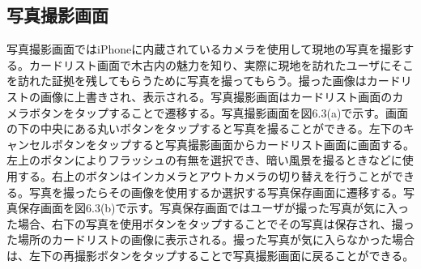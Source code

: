\subsection{写真撮影画面}
写真撮影画面ではiPhoneに内蔵されているカメラを使用して現地の写真を撮影する。カードリスト画面で木古内の魅力を知り、実際に現地を訪れたユーザにそこを訪れた証拠を残してもらうために写真を撮ってもらう。撮った画像はカードリストの画像に上書きされ、表示される。写真撮影画面はカードリスト画面のカメラボタンをタップすることで遷移する。写真撮影画面を図6.3(a)で示す。画面の下の中央にある丸いボタンをタップすると写真を撮ることができる。左下のキャンセルボタンをタップすると写真撮影画面からカードリスト画面に画面する。左上のボタンによりフラッシュの有無を選択でき、暗い風景を撮るときなどに使用する。右上のボタンはインカメラとアウトカメラの切り替えを行うことができる。写真を撮ったらその画像を使用するか選択する写真保存画面に遷移する。写真保存画面を図6.3(b)で示す。写真保存画面ではユーザが撮った写真が気に入った場合、右下の写真を使用ボタンをタップすることでその写真は保存され、撮った場所のカードリストの画像に表示される。撮った写真が気に入らなかった場合は、左下の再撮影ボタンをタップすることで写真撮影画面に戻ることができる。
\newpage

